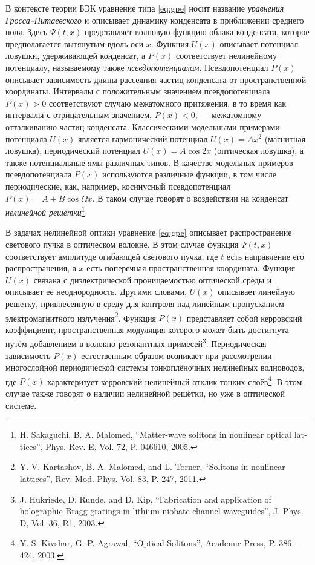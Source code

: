 \documentclass[candidate, href, colorlinks]{disser}
\begin{document}
В контексте теории БЭК уравнение типа \eqref{eq:gpe} носит название {\it уравнения Гросса--Питаевского} и описывает динамику конденсата в приближении среднего поля.
Здесь $\Psi(t, x)$ представляет волновую функцию облака конденсата, которое предполагается вытянутым вдоль оси $x$.
Функция $U(x)$ описывает потенциал ловушки, удерживающей конденсат, а $P(x)$ соответствует нелинейному потенциалу, называемому также {\it псевдопотенциалом}.
Псевдопотенциал $P(x)$ описывает зависимость длины рассеяния частиц конденсата от пространственной координаты.
Интервалы с положительным значением псевдопотенциала $P(x) > 0$ соответствуют случаю межатомного притяжения, в то время как интервалы с отрицательным значением, $P(x) < 0$, ---  межатомному отталкиванию частиц конденсата.
Классическими модельными примерами потенциала $U(x)$ является гармонический потенциал $U(x) = Ax^2$ (магнитная ловушка), периодический потенциал $U(x) = A \cos 2x$ (оптическая ловушка), а также потенциальные ямы различных типов.
В качестве модельных примеров псевдопотенциала $P(x)$ используются различные функции, в том числе периодические, как, например, косинусный псевдопотенциал $P(x) = A + B \cos \Omega x$.
В таком случае говорят о воздействии на конденсат {\it нелинейной решётки}\footnote{\label{note:malomed} H. Sakaguchi,  B. A. Malomed, ``Matter-wave solitons in nonlinear optical lat­tices'', Phys. Rev. E, Vol. 72, P. 046610, 2005.}.

В задачах нелинейной оптики уравнение \eqref{eq:gpe} описывает распространение светового пучка в оптическом волокне.
В этом случае функция $\Psi(t, x)$ соответствует амплитуде огибающей светового пучка, где $t$ есть направление его распространения, а $x$ есть поперечная пространственная координата.
Функция $U(x)$ связана с диэлектрической проницаемостью оптической среды и описывает её неоднородность.
Другими словами, $U(x)$ описывает линейную решетку, привнесенную в среду для контроля над линейным пропусканием электромагнитного излучения\footnote{\label{note:torner} Y. V. Kartashov, B. A. Malomed, and L. Torner, ``Solitons in nonlinear lattices'', Rev. Mod. Phys. Vol. 83, P. 247, 2011.}.
Функция $P(x)$ представляет собой керровский коэффициент, пространственная модуляция которого может быть достигнута путём добавлением в волокно резонантных примесей\footnote{J. Hukriede, D. Runde, and D. Kip, ``Fabrication and application of holographic Bragg gratings in lithium niobate channel waveguides'', J. Phys. D, Vol. 36, R1, 2003.}.
Периодическая зависимость $P(x)$ естественным образом возникает при рассмотрении многослойной периодической системы тонкоплёночных нелинейных волноводов, где $P(x)$ характеризует керровский нелинейный отклик тонких слоёв\footnote{Y. S. Kivshar, G. P. Agrawal, ``Optical Solitons'', Academic Press, P. 386--424, 2003.}.
В этом случае также говорят о наличии нелинейной решётки, но уже в оптической системе.
\end{document}
